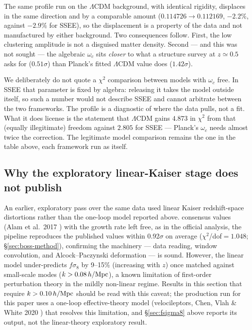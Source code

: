 \documentclass[12pt,a4paper]{article}
\newcommand{\SSEE}{\textsc{SSEE}}
\begin{document}
The same profile run on the $\Lambda$CDM background, with identical rigidity,
displaces in the same direction and by a comparable amount
($0.114726\rightarrow0.112169$, $-2.2\%$, against $-2.9\%$ for \SSEE{}), so
the displacement is a property of the data and not manufactured by either
background. Two consequences follow. First, the low clustering amplitude is
not a disguised matter density. Second --- and this was not sought --- the
algebraic $\omega_c$ sits \emph{closer} to what a structure survey at
$z\simeq0.5$ asks for ($0.51\sigma$) than Planck's fitted $\Lambda$CDM value
does ($1.42\sigma$).

We deliberately do not quote a $\chi^2$ comparison between models with
$\omega_c$ free. In \SSEE{} that parameter is fixed by algebra: releasing it
takes the model outside itself, so such a number would not describe \SSEE{}
and cannot arbitrate between the two frameworks. The profile is a diagnostic
of where the data pulls, not a fit. What it does license is the statement
that $\Lambda$CDM gains $4.873$ in $\chi^2$ from that (equally illegitimate)
freedom against $2.805$ for \SSEE{} --- Planck's $\omega_c$ needs almost twice
the correction. The legitimate model comparison remains the one in the table
above, each framework run as itself.

\subsection{Why the exploratory linear-Kaiser stage does not publish}
\label{sec:limitation-kaiser}

An earlier, exploratory pass over the same data used linear Kaiser
redshift-space distortions rather than the one-loop model reported above.%
consensus values (Alam et al.~2017 \citep{Alam2017}) with the growth rate left free, as in the
official analysis, the pipeline reproduces the published values within
0.92$\sigma$ on average ($\chi^2$/dof$=1.048$; \S\ref{sec:boss-method}),
confirming the machinery --- data reading, window convolution, and
Alcock--Paczynski deformation --- is sound. However, the linear model
under-predicts $f\sigma_8$ by 9--15\% (increasing with $z$) once matched
against small-scale modes ($k>0.08\,h/{\rm Mpc}$), a known limitation of
first-order perturbation theory in the mildly non-linear regime. Results in
this section that require $k>0.10\,h/{\rm Mpc}$ should be read with this
caveat; the production run for this paper uses a one-loop
effective-theory model (velocileptors, Chen, Vlah \& White 2020 \citep{ChenVlahWhite2020}) that
resolves this limitation, and \S\ref{sec:fsigma8} above reports its output,
not the linear-theory exploratory result.
\end{document}
